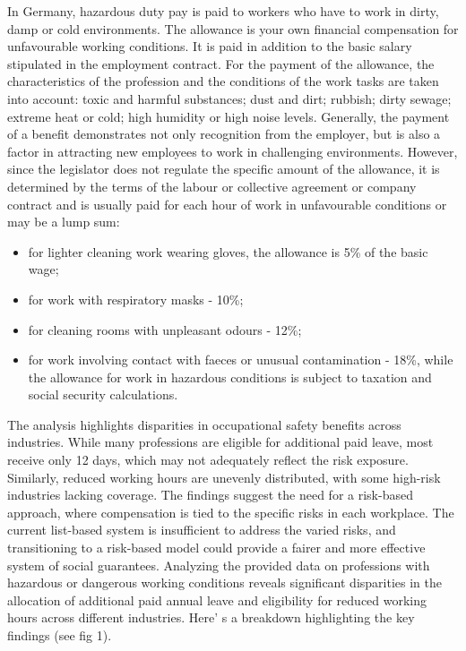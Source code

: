\begin{multicols}{2}
In Germany, hazardous duty pay is paid to workers who have to work in
dirty, damp or cold environments. The allowance is your own financial
compensation for unfavourable working conditions. It is paid in addition
to the basic salary stipulated in the employment contract. For the
payment of the allowance, the characteristics of the profession and the
conditions of the work tasks are taken into account: toxic and harmful
substances; dust and dirt; rubbish; dirty sewage; extreme heat or cold;
high humidity or high noise levels. Generally, the payment of a benefit
demonstrates not only recognition from the employer, but is also a
factor in attracting new employees to work in challenging environments.
However, since the legislator does not regulate the specific amount of
the allowance, it is determined by the terms of the labour or collective
agreement or company contract and is usually paid for each hour of work
in unfavourable conditions or may be a lump sum:

\begin{itemize}
\item
  for lighter cleaning work wearing gloves, the allowance is 5\% of the
  basic wage;
\item
  for work with respiratory masks - 10\%;
\item
  for cleaning rooms with unpleasant odours - 12\%;
\item
  for work involving contact with faeces or unusual contamination -
  18\%, while the allowance for work in hazardous conditions is subject
  to taxation and social security calculations.
\end{itemize}

The analysis highlights disparities in occupational safety benefits
across industries. While many professions are eligible for additional
paid leave, most receive only 12 days, which may not adequately reflect
the risk exposure. Similarly, reduced working hours are unevenly
distributed, with some high-risk industries lacking coverage. The
findings suggest the need for a risk-based approach, where compensation
is tied to the specific risks in each workplace. The current list-based
system is insufficient to address the varied risks, and transitioning to
a risk-based model could provide a fairer and more effective system of
social guarantees. Analyzing the provided data on professions with
hazardous or dangerous working conditions reveals significant
disparities in the allocation of additional paid annual leave and
eligibility for reduced working hours across different industries.
Here' s a breakdown highlighting the key findings (see
fig 1).
\end{multicols}

